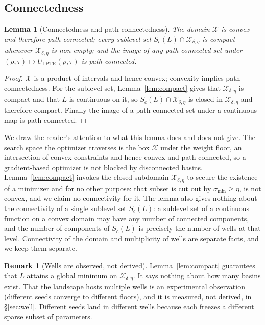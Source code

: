 \documentclass[twocolumn,aps,prl,superscriptaddress,showkeys]{revtex4-2}
\theoremstyle{plain}
\newtheorem{lemma}{Lemma}
\theoremstyle{definition}
\newtheorem{remark}{Remark}
\begin{document}
\subsection{Connectedness}

\begin{lemma}[Connectedness and path-connectedness]
\label{lem:connected}
The domain $\mathcal{X}$ is convex and therefore path-connected; every sublevel set $S_c(L)\cap\mathcal{X}_{\delta,\eta}$ is compact whenever $\mathcal{X}_{\delta,\eta}$ is non-empty; and the image of any path-connected set under $(\rho,\tau)\mapsto U_{\mathrm{LPTE}}(\rho,\tau)$ is path-connected.
\end{lemma}
\begin{proof}
$\mathcal{X}$ is a product of intervals and hence convex; convexity implies path-connectedness. For the sublevel set, Lemma~\ref{lem:compact} gives that $\mathcal{X}_{\delta,\eta}$ is compact and that $L$ is continuous on it, so $S_c(L)\cap\mathcal{X}_{\delta,\eta}$ is closed in $\mathcal{X}_{\delta,\eta}$ and therefore compact. Finally the image of a path-connected set under a continuous map is path-connected.
\end{proof}

We draw the reader's attention to what this lemma does and does not give. The search space the optimizer traverses is the box $\mathcal{X}$ under the weight floor, an intersection of convex constraints and hence convex and path-connected, so a gradient-based optimizer is not blocked by disconnected basins. Lemma~\ref{lem:compact} invokes the closed subdomain $\mathcal{X}_{\delta,\eta}$ to secure the existence of a minimizer and for no other purpose: that subset is cut out by $\sigma_{\min}\ge\eta$, is not convex, and we claim no connectivity for it. The lemma also gives nothing about the connectivity of a single sublevel set $S_c(L)$: a sublevel set of a continuous function on a convex domain may have any number of connected components, and the number of components of $S_c(L)$ is precisely the number of wells at that level. Connectivity of the domain and multiplicity of wells are separate facts, and we keep them separate.

\begin{remark}[Wells are observed, not derived]
\label{rem:obs-wells}
Lemma~\ref{lem:compact} guarantees that $L$ attains a global minimum on $\mathcal{X}_{\delta,\eta}$. It says nothing about how many basins exist. That the landscape hosts multiple wells is an experimental observation (different seeds converge to different floors), and it is measured, not derived, in \S\ref{sec:well}. Different seeds land in different wells because each freezes a different sparse subset of parameters.
\end{remark}
\end{document}
